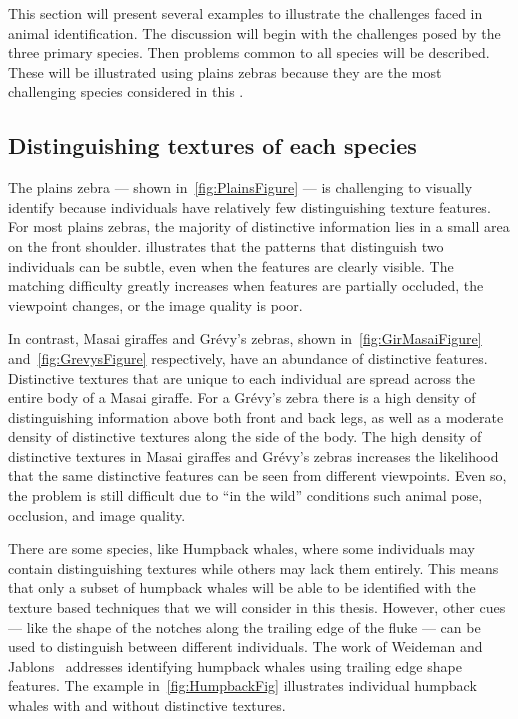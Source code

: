     This section will present several examples to illustrate the challenges faced in animal identification. The
    discussion will begin with the challenges posed by the three primary species. Then problems common to all
    species will be described. These will be illustrated using plains zebras because they are the most challenging
    species considered in this \thesis{}.

    \subsection{Distinguishing textures of each species}
        The plains zebra --- shown in~\cref{fig:PlainsFigure} --- is challenging to visually identify because
        individuals have relatively few distinguishing texture features. For most plains zebras, the majority of distinctive
        information lies in a small area on the front shoulder.  illustrates that the patterns
        that distinguish two individuals can be subtle, even when the features are clearly visible. The matching
        difficulty greatly increases when features are partially occluded, the viewpoint changes, or the image quality
        is poor.

        In contrast, Masai giraffes and Grévy's zebras, shown in~\cref{fig:GirMasaiFigure}
        and~\cref{fig:GrevysFigure} respectively, have an abundance of distinctive features. Distinctive textures
        that are unique to each individual are spread across the entire body of a Masai giraffe. For a Grévy's
        zebra there is a high density of distinguishing information above both front and back legs, as well as a
        moderate density of distinctive textures along the side of the body. The high density of distinctive
        textures in Masai giraffes and Grévy's zebras increases the likelihood that the same distinctive features
        can be seen from different viewpoints. Even so, the problem is still difficult due to ``in the wild''
        conditions such animal pose, occlusion, and image quality.

        There are some species, like Humpback whales, where some individuals may contain distinguishing textures
          while others may lack them entirely.
        This means that only a subset of humpback whales will be able to be identified with the texture based
          techniques that we will consider in this thesis.
        However, other cues --- like the shape of the notches along the trailing edge of the fluke --- can be
          used to distinguish between different individuals.
        The work of Weideman and Jablons~\cite{jablons_identifying_2016} addresses identifying
          humpback whales using trailing edge shape features.
        The example in~\cref{fig:HumpbackFig} illustrates individual humpback whales with and without distinctive
          textures.


